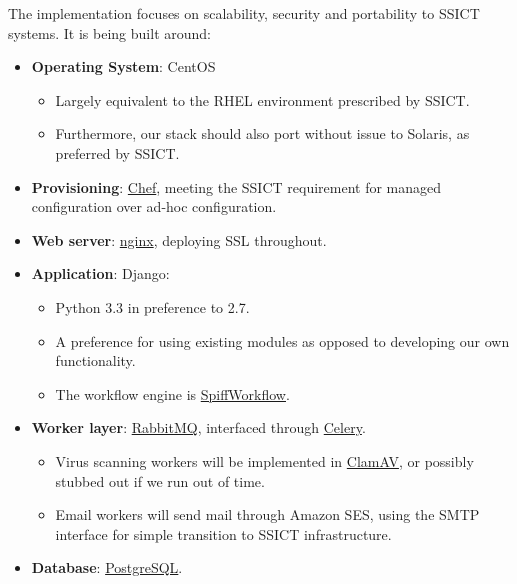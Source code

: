 \documentclass[12pt,a4paper,twosided]{article}
\begin{document}
The implementation focuses on scalability, security and portability to
SSICT systems. It is being built around:

\begin{itemize}
\itemsep1pt\parskip0pt
\item
  \textbf{Operating System}: CentOS

  \begin{itemize}
  \itemsep1pt\parskip0pt
  \item
    Largely equivalent to the RHEL environment prescribed by SSICT.
  \item
    Furthermore, our stack should also port without issue to Solaris, as
    preferred by SSICT.
  \end{itemize}
\item
  \textbf{Provisioning}: \href{http://www.opscode.com/chef/}{Chef},
  meeting the SSICT requirement for managed configuration over ad-hoc
  configuration.
\item
  \textbf{Web server}: \href{http://nginx.org/en}{nginx}, deploying SSL
  throughout.
\item
  \textbf{Application}: Django:

  \begin{itemize}
  \itemsep1pt\parskip0pt
  \item
    Python 3.3 in preference to 2.7.
  \item
    A preference for using existing modules as opposed to developing our
    own functionality.
  \item
    The workflow engine is
    \href{https://github.com/knipknap/SpiffWorkflow}{SpiffWorkflow}.
  \end{itemize}
\item
  \textbf{Worker layer}: \href{http://rabbitmq.com}{RabbitMQ},
  interfaced through \href{http://www.celeryproject.org/}{Celery}.

  \begin{itemize}
  \itemsep1pt\parskip0pt
  \item
    Virus scanning workers will be implemented in
    \href{http://www.clamav.net/lang/en/}{ClamAV}, or possibly stubbed
    out if we run out of time.
  \item
    Email workers will send mail through Amazon SES, using the SMTP
    interface for simple transition to SSICT infrastructure.
  \end{itemize}
\item
  \textbf{Database}: \href{http://postgresql.org}{PostgreSQL}.


\end{itemize}
\end{document}
